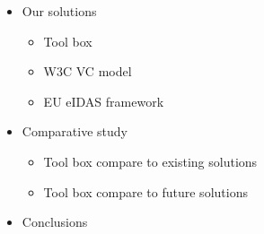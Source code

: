 \documentclass[runningheads,a4paper]{llncs}
\begin{document}
\begin{itemize}
\begin{itemize}
        \end{itemize}
    \item Our solutions
        \begin{itemize}
            \item Tool box
            \item W3C VC model
            \item EU eIDAS framework
        \end{itemize}
    \item Comparative study
        \begin{itemize}
            \item Tool box compare to existing solutions
            \item Tool box compare to future solutions
        \end{itemize}
    \item Conclusions
\end{itemize}



\end{document}
